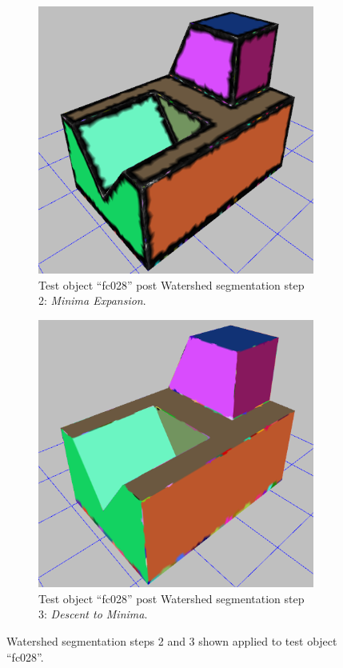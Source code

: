 \begin{figure}[htb]
	\centering
	\begin{subfigure}{0.45\textwidth}
		\includegraphics[width=\linewidth]{../resources/watershed/fc028_WS2.png}
		\caption{Test object ``fc028'' post Watershed segmentation step 2: \textit{Minima Expansion}.}
		\label{sfig:ws_2}
	\end{subfigure}
	\hfill
	\begin{subfigure}{0.45\textwidth}
		\centering
		\includegraphics[width=\linewidth]{../resources/watershed/fc028_WS3.png}
		\caption{Test object ``fc028'' post Watershed segmentation step 3: \textit{Descent to Minima}.}
		\label{sfig:ws_3}
	\end{subfigure}
	\caption{Watershed segmentation steps 2 and 3 shown applied to test object ``fc028''.}
\end{figure}

